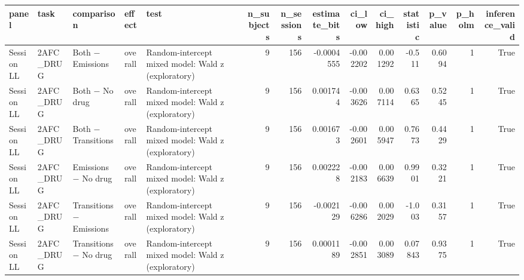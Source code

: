 \begin{tabular}{lllllrrrrrrrrr}
\toprule
panel & task & comparison & effect & test & n\_subjects & n\_sessions & estimate\_bits & ci\_low & ci\_high & statistic & p\_value & p\_holm & inference\_valid \\
\midrule
Session LL & 2AFC\_DRUG & Both − Emissions & overall & Random-intercept mixed model: Wald z (exploratory) & 9 & 156 & -0.0004555 & -0.002202 & 0.001292 & -0.511 & 0.6094 & 1 & True \\
Session LL & 2AFC\_DRUG & Both − No drug & overall & Random-intercept mixed model: Wald z (exploratory) & 9 & 156 & 0.001744 & -0.003626 & 0.007114 & 0.6365 & 0.5245 & 1 & True \\
Session LL & 2AFC\_DRUG & Both − Transitions & overall & Random-intercept mixed model: Wald z (exploratory) & 9 & 156 & 0.001673 & -0.002601 & 0.005947 & 0.7673 & 0.4429 & 1 & True \\
Session LL & 2AFC\_DRUG & Emissions − No drug & overall & Random-intercept mixed model: Wald z (exploratory) & 9 & 156 & 0.002228 & -0.002183 & 0.006639 & 0.9901 & 0.3221 & 1 & True \\
Session LL & 2AFC\_DRUG & Transitions − Emissions & overall & Random-intercept mixed model: Wald z (exploratory) & 9 & 156 & -0.002129 & -0.006286 & 0.002029 & -1.003 & 0.3157 & 1 & True \\
Session LL & 2AFC\_DRUG & Transitions − No drug & overall & Random-intercept mixed model: Wald z (exploratory) & 9 & 156 & 0.0001189 & -0.002851 & 0.003089 & 0.07843 & 0.9375 & 1 & True \\
\bottomrule
\end{tabular}
